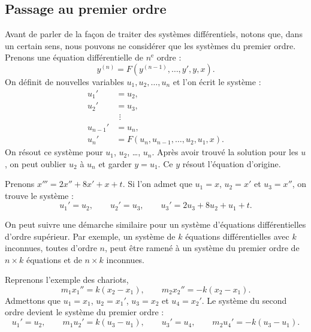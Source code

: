 \subsection{Passage au premier ordre}

Avant de parler de la façon de traiter des systèmes différentiels, notons que, dans un certain sens, nous pouvons ne considérer que les systèmes du premier ordre. Prenons une équation différentielle de $n^{\text{e}}$ ordre :
\begin{equation*}
y^{(n)} = F(y^{(n-1)},\ldots,y',y,x) .
\end{equation*}
On définit de nouvelles variables $u_1, u_2, \ldots, u_n$ et l'on écrit le système :
\begin{align*}
u_1' & = u_2 , \\
u_2' & = u_3 , \\
& ~\, \vdots \\
u_{n-1}' & = u_n , \\
u_n' & = F(u_n,u_{n-1},\ldots,u_2,u_1,x) .
\end{align*}
On résout ce système pour $u_1$, $u_2$, \ldots, $u_n$. Après avoir trouvé la solution pour les $u$,
on peut oublier $u_2$ à $u_n$ et garder $y = u_1$.
Ce $y$ résout l'équation d'origine.

\begin{example}
Prenons $x''' = 2x''+ 8x' + x + t$. Si l'on admet que $u_1 = x$, $u_2 = x'$ et $u_3
= x''$, on trouve le système :
\begin{equation*}
u_1' = u_2, \qquad u_2' = u_3, \qquad u_3' = 2u_3 + 8u_2 + u_1 + t .
\end{equation*}
\end{example}

On peut suivre une démarche similaire pour un système d'équations différentielles d'ordre supérieur. Par exemple, un système de $k$ équations différentielles avec $k$
inconnues, toutes d'ordre $n$, peut être ramené à un système du premier ordre de 
$n \times k$
équations et de $n \times k$ inconnues.

\begin{example}
Reprenons l'exemple des chariots,
\begin{equation*}
m_1 x_1'' = k(x_2-x_1), \qquad m_2 x_2'' = - k(x_2-x_1) .
\end{equation*}
Admettons que $u_1 = x_1$, $u_2 = x_1'$, 
$u_3 = x_2$ et $u_4 = x_2'$. Le système du second ordre devient le système du premier ordre :
\begin{equation*}
u_1' = u_2, \qquad
m_1 u_2' = k(u_3-u_1), \qquad
u_3' = u_4, \qquad
m_2 u_4' = - k(u_3-u_1) .
\end{equation*}
\end{example}

